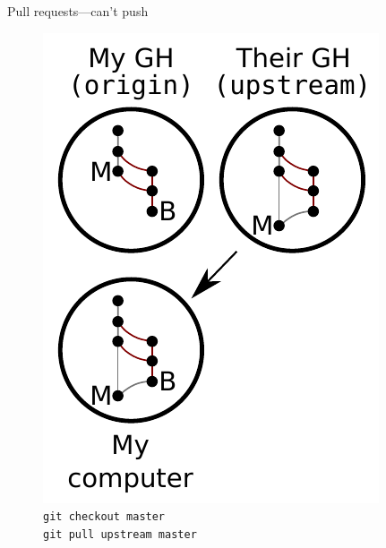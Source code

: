 \begin{frame}{Pull requests---can't push}
  \begin{figure}
    \includegraphics{fork_015.pdf}
    \\ \texttt{git checkout master}
    \\ \texttt{git pull upstream master}
  \end{figure}
\end{frame}

